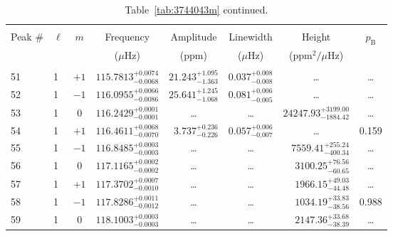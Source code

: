 \begin{table*}[!]
\caption{Table~\ref{tab:3744043m} continued.}
\label{tab:3744043m2}
\centering
\begin{tabular}{llcrrlrc}
\hline\hline
\\[-8pt]          
Peak \# & $\ell$ & $m$ & \multicolumn{1}{c}{Frequency} & \multicolumn{1}{c}{Amplitude} & \multicolumn{1}{c}{Linewidth} & \multicolumn{1}{c}{Height}& $p_\mathrm{B}$\\
 & & & \multicolumn{1}{c}{($\mu$Hz)} & \multicolumn{1}{c}{(ppm)} & \multicolumn{1}{c}{($\mu$Hz)} & \multicolumn{1}{c}{(ppm$^2/\mu$Hz)}\\
\hline \\[-8pt]
51 & 1 & $+1$ & $    115.7813_{-      0.0068}^{+      0.0074}$ & $      21.243_{-       1.363}^{+       1.095}$ & $       0.037_{-       0.008}^{+       0.008}$ & \multicolumn{1}{c}{\dots} & \dots\\[1pt]
52 & 1 & $-1$ & $    116.0955_{-      0.0086}^{+      0.0066}$ & $      25.641_{-       1.068}^{+       1.245}$ & $       0.081_{-       0.005}^{+       0.006}$ & \multicolumn{1}{c}{\dots} & \dots\\[1pt]
53 & 1 & 0 & $    116.2429_{-      0.0001}^{+      0.0001}$ & \multicolumn{1}{c}{\dots} & \multicolumn{1}{c}{\dots} & $    24247.93_{-     1884.42}^{+     3199.00}$ & \dots\\[1pt]
54  & 1 & $+1$ & $    116.4611_{-      0.0070}^{+      0.0068}$ & $       3.737_{-       0.226}^{+       0.236}$ & $       0.057_{-       0.007}^{+       0.006}$ & \multicolumn{1}{c}{\dots} & 0.159\\[1pt]
55 & 1 & $-1$ & $    116.8485_{-      0.0003}^{+      0.0003}$ & \multicolumn{1}{c}{\dots} & \multicolumn{1}{c}{\dots} & $     7559.41_{-      400.34}^{+      255.24}$ & \dots\\[1pt]
56 & 1 & 0 & $    117.1165_{-      0.0002}^{+      0.0002}$ & \multicolumn{1}{c}{\dots} & \multicolumn{1}{c}{\dots} & $     3100.25_{-       60.65}^{+       76.56}$ & \dots\\[1pt]
57 & 1 & $+1$ & $    117.3702_{-      0.0010}^{+      0.0007}$ & \multicolumn{1}{c}{\dots} & \multicolumn{1}{c}{\dots} & $     1966.15_{-       44.48}^{+       49.03}$ & \dots\\[1pt]
58 & 1 & $-1$ & $    117.8286_{-      0.0012}^{+      0.0011}$ & \multicolumn{1}{c}{\dots} & \multicolumn{1}{c}{\dots} & $     1034.19_{-       38.56}^{+       33.83}$ & 0.988\\[1pt]
59 & 1 & 0 & $    118.1003_{-      0.0003}^{+      0.0003}$ & \multicolumn{1}{c}{\dots} & \multicolumn{1}{c}{\dots} & $     2147.36_{-       38.39}^{+       33.68}$ & \dots\\[1pt]

\end{tabular}
\end{table*}
